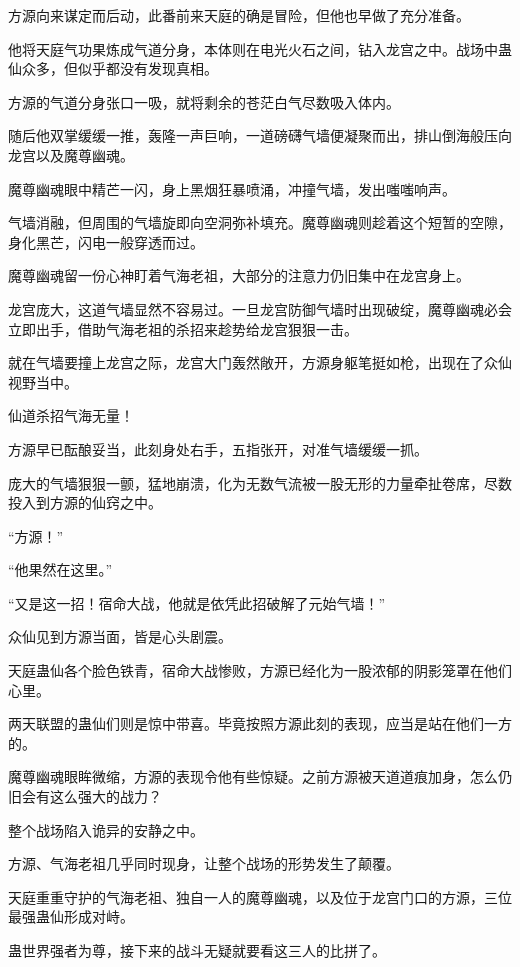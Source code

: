 
\begin{this_body}

方源向来谋定而后动，此番前来天庭的确是冒险，但他也早做了充分准备。

他将天庭气功果炼成气道分身，本体则在电光火石之间，钻入龙宫之中。战场中蛊仙众多，但似乎都没有发现真相。

方源的气道分身张口一吸，就将剩余的苍茫白气尽数吸入体内。

随后他双掌缓缓一推，轰隆一声巨响，一道磅礴气墙便凝聚而出，排山倒海般压向龙宫以及魔尊幽魂。

魔尊幽魂眼中精芒一闪，身上黑烟狂暴喷涌，冲撞气墙，发出嗤嗤响声。

气墙消融，但周围的气墙旋即向空洞弥补填充。魔尊幽魂则趁着这个短暂的空隙，身化黑芒，闪电一般穿透而过。

魔尊幽魂留一份心神盯着气海老祖，大部分的注意力仍旧集中在龙宫身上。

龙宫庞大，这道气墙显然不容易过。一旦龙宫防御气墙时出现破绽，魔尊幽魂必会立即出手，借助气海老祖的杀招来趁势给龙宫狠狠一击。

就在气墙要撞上龙宫之际，龙宫大门轰然敞开，方源身躯笔挺如枪，出现在了众仙视野当中。

仙道杀招气海无量！

方源早已酝酿妥当，此刻身处右手，五指张开，对准气墙缓缓一抓。

庞大的气墙狠狠一颤，猛地崩溃，化为无数气流被一股无形的力量牵扯卷席，尽数投入到方源的仙窍之中。

“方源！”

“他果然在这里。”

“又是这一招！宿命大战，他就是依凭此招破解了元始气墙！”

众仙见到方源当面，皆是心头剧震。

天庭蛊仙各个脸色铁青，宿命大战惨败，方源已经化为一股浓郁的阴影笼罩在他们心里。

两天联盟的蛊仙们则是惊中带喜。毕竟按照方源此刻的表现，应当是站在他们一方的。

魔尊幽魂眼眸微缩，方源的表现令他有些惊疑。之前方源被天道道痕加身，怎么仍旧会有这么强大的战力？

整个战场陷入诡异的安静之中。

方源、气海老祖几乎同时现身，让整个战场的形势发生了颠覆。

天庭重重守护的气海老祖、独自一人的魔尊幽魂，以及位于龙宫门口的方源，三位最强蛊仙形成对峙。

蛊世界强者为尊，接下来的战斗无疑就要看这三人的比拼了。


\end{this_body}
